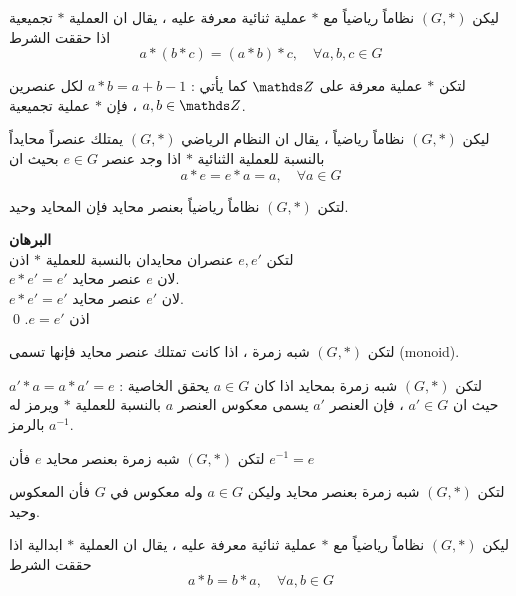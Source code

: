 \begin{definition}
	ليكن $(G, *)$ نظاماً رياضياً مع $*$ عملية ثنائية معرفة عليه ، يقال ان العملية $*$ تجميعية اذا حققت الشرط
	\[
	a*(b*c) = (a*b)*c,\quad \forall a,b,c\in G
	\]
\end{definition}



\begin{example}
	لتكن $*$ عملية معرفة على $\Z$ كما يأتي : $a*b =a+b-1$ لكل عنصرين $a, b\in \Z$ ، فإن $*$ عملية تجميعية.
\end{example}

\begin{definition}
	ليكن $(G, *)$ نظاماً رياضياً ، يقال ان النظام الرياضي $(G, *)$ يمتلك عنصراً محايداً بالنسبة للعملية الثنائية $*$ اذا وجد عنصر $e \in G$ بحيث ان
	\[
	a * e = e*a = a,\quad \forall a\in G
	\]
\end{definition}

\begin{theorem}
	لتكن $(G, *)$ نظاماً رياضياً بعنصر محايد فإن المحايد وحيد.
\end{theorem}
\noindent
\textbf{البرهان}\\
\noindent
لتكن $e, e'$ عنصران محايدان بالنسبة للعملية $*$ اذن\\
$e*e' =e'$ لان $e$ عنصر محايد.\\
$e*e' =e'$ لان $e'$ عنصر محايد.\\
اذن $e=e'$. \qed

\begin{definition}
	لتكن $(G, *)$ شبه زمرة ، اذا كانت تمتلك عنصر محايد فإنها تسمى (monoid).
\end{definition}
\newpage
\begin{definition}
	لتكن $(G, *)$ شبه زمرة بمحايد اذا كان $a\in G$ يحقق الخاصية : $a'*a=a*a'=e$ حيث ان $a'\in G$ ، فإن العنصر $a'$ يسمى معكوس العنصر $a$ بالنسبة للعملية $*$ ويرمز له بالرمز $a^{-1}$.
\end{definition}

\begin{note}
	لتكن $(G, *)$ شبه زمرة بعنصر محايد $e$ فأن $e^{-1}=e$
\end{note}

\begin{theorem}
	لتكن $(G, *)$ شبه زمرة بعنصر محايد وليكن $a\in G$ وله معكوس في $G$ فأن المعكوس وحيد.
\end{theorem}

\begin{definition}
	ليكن $(G, *)$ نظاماً رياضياً مع $*$ عملية ثنائية معرفة عليه ، يقال ان العملية $*$ ابدالية اذا حققت الشرط
	\[
	a*b = b*a,\quad \forall a,b\in G
	\]
\end{definition}

